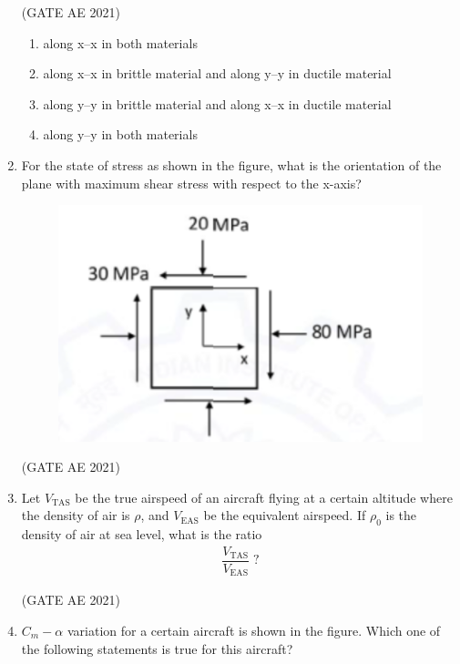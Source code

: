 \documentclass[journal,12pt,onecolumn]{IEEEtran}
\theoremstyle{remark}
\begin{document}
\begin{flushleft}
\begin{enumerate}
\hfill (GATE AE 2021)

\begin{enumerate}
\item along x--x in both materials
\item along x--x in brittle material and along y--y in ductile material
\item along y--y in brittle material and along x--x in ductile material
\item along y--y in both materials
\end{enumerate}
\item 
For the state of stress as shown in the figure, what is the orientation of the plane with maximum shear stress with respect to the x-axis?
\begin{figure}[H]
    \centering
    \includegraphics[width=0.5\columnwidth]{figs/11.png}
    \caption{}
    \label{fig:placeholder}
\end{figure}
\hfill (GATE AE 2021)

\begin{enumerate}
\end{enumerate}

\item 
Let $V_{\text{TAS}}$ be the true airspeed of an aircraft flying at a certain altitude where the density of air is $\rho$, and $V_{\text{EAS}}$ be the equivalent airspeed. If $\rho_0$ is the density of air at sea level, what is the ratio
\begin{align*}
\dfrac{V_{\text{TAS}}}{V_{\text{EAS}}}\; ?
\end{align*}

\hfill (GATE AE 2021)

\begin{enumerate}
\end{enumerate}
\item $C_m - \alpha$ variation for a certain aircraft is shown in the figure. Which one of the following statements is true for this aircraft?


\end{enumerate}
\end{flushleft}
\end{document}
